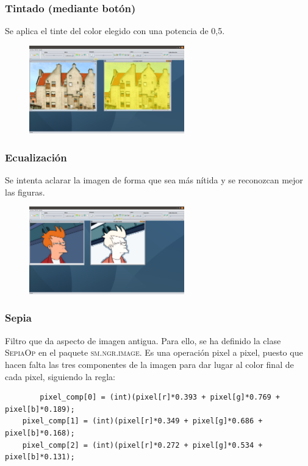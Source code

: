\documentclass[11pt,a4paper]{article}
\begin{document}
\subsubsection{Tintado (mediante botón)}
Se aplica el tinte del color elegido con una potencia de 0,5.

\begin{figure}[H]
\centering
	\includegraphics[width=0.6\textwidth]{img/tinte.png}
\end{figure}

\subsubsection{Ecualización}
Se intenta aclarar la imagen de forma que sea más nítida y se reconozcan mejor las figuras.

\begin{figure}[H]
\centering
	\includegraphics[width=0.6\textwidth]{img/ecual.png}
\end{figure}

\subsubsection{Sepia}
Filtro que da aspecto de imagen antigua. Para ello, se ha definido la clase \textsc{SepiaOp} en el paquete \textsc{sm.ngr.image}. Es una operación pixel a pixel, puesto que hacen falta las tres componentes de la imagen para dar lugar al color final de cada pixel, siguiendo la regla:\\

\begin{lstlisting}
		pixel_comp[0] = (int)(pixel[r]*0.393 + pixel[g]*0.769 + pixel[b]*0.189);
    pixel_comp[1] = (int)(pixel[r]*0.349 + pixel[g]*0.686 + pixel[b]*0.168);
    pixel_comp[2] = (int)(pixel[r]*0.272 + pixel[g]*0.534 + pixel[b]*0.131);
\end{lstlisting}
\end{document}
